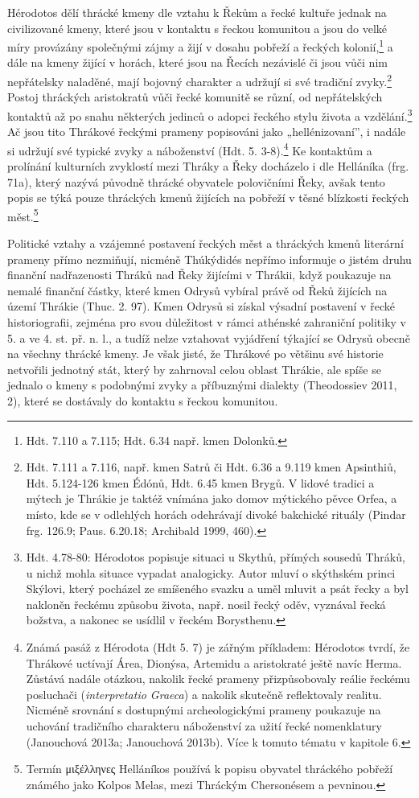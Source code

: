 Hérodotos dělí thrácké kmeny dle vztahu k Řekům a řecké kultuře jednak na civilizované kmeny, které jsou v kontaktu s řeckou komunitou a jsou do velké míry provázány společnými zájmy a žijí v dosahu pobřeží a řeckých kolonií,\footnote{Hdt. 7.110 a 7.115; Hdt. 6.34 např. kmen Dolonků.} a dále na kmeny žijící v horách, které jsou na Řecích nezávislé či jsou vůči nim nepřátelsky naladěné, mají bojovný charakter a udržují si své tradiční zvyky.\footnote{Hdt. 7.111 a 7.116, např. kmen Satrů či Hdt. 6.36 a 9.119 kmen Apsinthiů, Hdt. 5.124-126 kmen Édónů, Hdt. 6.45 kmen Brygů. V lidové tradici a mýtech je Thrákie je taktéž vnímána jako domov mýtického pěvce Orfea, a místo, kde se v odlehlých horách odehrávají divoké bakchické rituály (Pindar frg. 126.9; Paus. 6.20.18; Archibald 1999, 460).} Postoj thráckých aristokratů vůči řecké komunitě se různí, od nepřátelských kontaktů až po snahu některých jedinců o adopci řeckého stylu života a vzdělání.\footnote{Hdt. 4.78-80: Hérodotos popisuje situaci u Skythů, přímých sousedů Thráků, u nichž mohla situace vypadat analogicky. Autor mluví o skýthském princi Skýlovi, který pocházel ze smíšeného svazku a uměl mluvit a psát řecky a byl nakloněn řeckému způsobu života, např. nosil řecký oděv, vyznával řecká božstva, a nakonec se usídlil v řeckém Borysthenu.} Ač jsou tito Thrákové řeckými prameny popisováni jako „hellénizovaní”, i nadále si udržují své typické zvyky a náboženství (Hdt. 5. 3-8).\footnote{Známá pasáž z Hérodota (Hdt 5. 7) je zářným příkladem: Hérodotos tvrdí, že Thrákové uctívají Área, Dionýsa, Artemidu a aristokraté ještě navíc Herma. Zůstává nadále otázkou, nakolik řecké prameny přizpůsobovaly reálie řeckému posluchači ({\em interpretatio Graeca}) a nakolik skutečně reflektovaly realitu. Nicméně srovnání s dostupnými archeologickými prameny poukazuje na uchování tradičního charakteru náboženství za užití řecké nomenklatury (Janouchová 2013a; Janouchová 2013b). Více k tomuto tématu v kapitole 6.} Ke kontaktům a prolínání kulturních zvyklostí mezi Thráky a Řeky docházelo i dle Helláníka (frg. 71a), který nazývá původně thrácké obyvatele polovičními Řeky, avšak tento popis se týká pouze thráckých kmenů žijících na pobřeží v těsné blízkosti řeckých měst.\footnote{Termín μιξέλληνες Helláníkos používá k popisu obyvatel thráckého pobřeží známého jako Kolpos Melas, mezi Thráckým Chersonésem a pevninou.}

Politické vztahy a vzájemné postavení řeckých měst a thráckých kmenů literární prameny přímo nezmiňují, nicméně Thúkýdidés nepřímo informuje o jistém druhu finanční nadřazenosti Thráků nad Řeky žijícími v Thrákii, když poukazuje na nemalé finanční částky, které kmen Odrysů vybíral právě od Řeků žijících na území Thrákie (Thuc. 2. 97). Kmen Odrysů si získal výsadní postavení v řecké historiografii, zejména pro svou důležitost v rámci athénské zahraniční politiky v 5. a ve 4. st. př. n. l., a tudíž nelze vztahovat vyjádření týkající se Odrysů obecně na všechny thrácké kmeny. Je však jisté, že Thrákové po většinu své historie netvořili jednotný stát, který by zahrnoval celou oblast Thrákie, ale spíše se jednalo o kmeny s podobnými zvyky a příbuznými dialekty (Theodossiev 2011, 2), které se dostávaly do kontaktu s řeckou komunitou.

